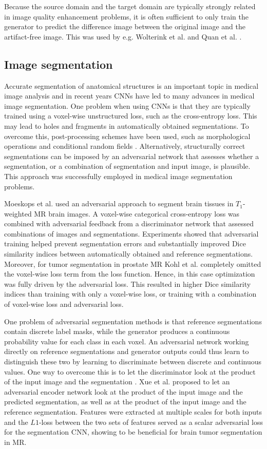 \documentclass{article}
\begin{document}
Because the source domain and the target domain are typically strongly related in image quality enhancement problems, it is often sufficient to only train the generator to predict the difference image between the original image and the artifact-free image. This was used by e.g. Wolterink et al. \cite{Wolt17} and Quan et al. \cite{Quan18}. 

\subsection{Image segmentation}
\label{sec:biomedtasks}
Accurate segmentation of anatomical structures is an important topic in medical image analysis and in recent years CNNs have led to many advances in medical image segmentation. One problem when using CNNs is that they are typically trained using a voxel-wise unstructured loss, such as the cross-entropy loss. This may lead to holes and fragments in automatically obtained segmentations. To overcome this, post-processing schemes have been used, such as morphological operations and conditional random fields \cite{KamnCRF}. Alternatively, structurally correct segmentations can be imposed by an adversarial network that assesses whether a segmentation, or a combination of segmentation and input image, is plausible. This approach was successfully employed in medical image segmentation problems. 

Moeskops et al. \cite{Moes17} used an adversarial approach to segment brain tissues in $T_1$-weighted MR brain images. A voxel-wise categorical cross-entropy loss was combined with adversarial feedback from a discriminator network that assessed combinations of images and segmentations. Experiments showed that adversarial training helped prevent segmentation errors and substantially improved Dice similarity indices between automatically obtained and reference segmentations. Moreover, for tumor segmentation in prostate MR Kohl et al. \cite{Kohl17} completely omitted the voxel-wise loss term from the loss function. Hence, in this case optimization was fully driven by the adversarial loss. This resulted in higher Dice similarity indices than training with only  a voxel-wise loss, or training with a combination of voxel-wise loss and adversarial loss. 

One problem of adversarial segmentation methods is that reference segmentations contain discrete label masks, while the generator produces a continuous probability value for each class in each voxel. An adversarial network working directly on reference segmentations and generator outputs could thus learn to distinguish these two by learning to discriminate between discrete and continuous values. One way to overcome this is to let the discriminator look at the product of the input image and the segmentation \cite{Luc16}. Xue et al. \cite{Xue18} proposed to let an adversarial encoder network look at the product of the input image and the predicted segmentation, as well as at the product of the input image and the reference segmentation. Features were extracted at multiple scales for both inputs and the $L1$-loss between the two sets of features served as a scalar adversarial loss for the segmentation CNN, showing to be beneficial for brain tumor segmentation in MR.
\end{document}
